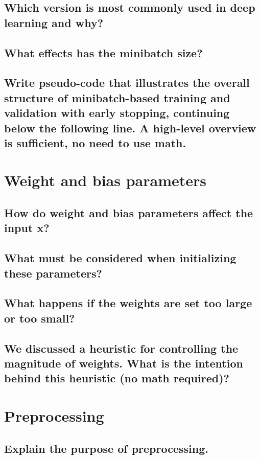 \subsection{Which version is most commonly used in deep learning and why?}

\subsection{What effects has the minibatch size?}

\subsection{Write pseudo-code that illustrates the overall structure of minibatch-based training and validation with early stopping, continuing below the following line. A high-level overview is sufficient, no need to use math.}

\section{Weight and bias parameters}

\subsection{How do weight and bias parameters affect the input x?}

\subsection{What must be considered when initializing these parameters?}

\subsection{What happens if the weights are set too large or too small?}

\subsection{We discussed a heuristic for controlling the magnitude of weights. What is the intention behind this heuristic (no math required)?}

\section{Preprocessing}

\subsection{Explain the purpose of preprocessing.}

